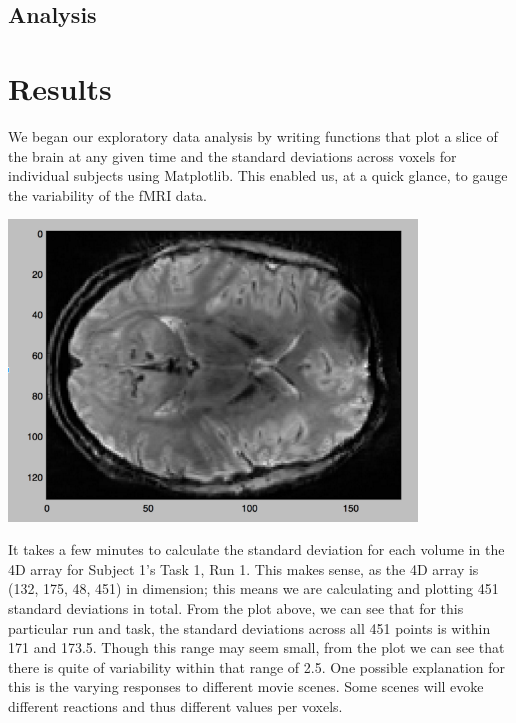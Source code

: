 \subsection{Analysis} 




\section{Results}

We began our exploratory data analysis by writing functions
that plot a slice of the brain at any given time and the standard deviations
across voxels for individual subjects using Matplotlib. This enabled us, at a
quick glance, to gauge the variability of the fMRI data.

\begin{center}
\includegraphics[height=8cm]{7}
\end{center}

It takes a few minutes to calculate the standard deviation for each volume in
the 4D array for Subject 1's Task 1, Run 1. This makes sense, as the 4D
array is (132, 175, 48, 451) in dimension; this means we are calculating and
plotting 451 standard deviations in total. From the plot above, we can see
that for this particular run and task, the standard deviations across all 451
points is within 171 and 173.5. Though this range may seem small, from the
plot we can see that there is quite of variability within that range of 2.5.
One possible explanation for this is the varying responses to different movie
scenes. Some scenes will evoke different reactions and thus different values
per voxels.

